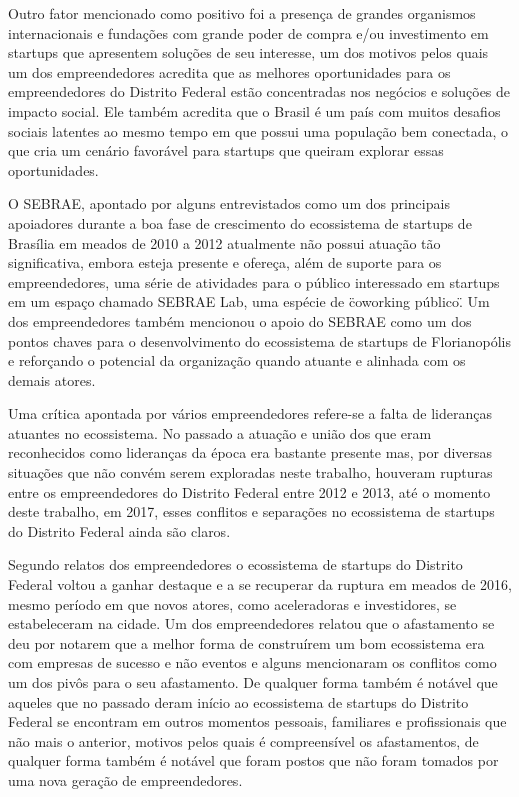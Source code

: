 Outro fator mencionado como positivo foi a presença de grandes organismos internacionais e fundações com grande poder de compra e/ou investimento em startups que apresentem soluções de seu interesse, um dos motivos pelos quais um dos empreendedores acredita que as melhores oportunidades para os empreendedores do Distrito Federal estão concentradas nos negócios e soluções de impacto social. Ele também acredita que o Brasil é um país com muitos desafios sociais latentes ao mesmo tempo em que possui uma população bem conectada, o que cria um cenário favorável para startups que queiram explorar essas oportunidades.

O SEBRAE, apontado por alguns entrevistados como um dos principais apoiadores durante a boa fase de crescimento do ecossistema de startups de Brasília em meados de 2010 a 2012 atualmente não possui atuação tão significativa, embora esteja presente e ofereça, além de suporte para os empreendedores, uma série de atividades para o público interessado em startups em um espaço chamado SEBRAE Lab, uma espécie de \"coworking público\". Um dos empreendedores também mencionou o apoio do SEBRAE como um dos pontos chaves para o desenvolvimento do ecossistema de startups de Florianopólis e reforçando o potencial da organização quando atuante e alinhada com os demais atores.

Uma crítica apontada por vários empreendedores refere-se a falta de lideranças atuantes no ecossistema. No passado a atuação e união dos que eram reconhecidos como lideranças da época era bastante presente mas, por diversas situações que não convém serem exploradas neste trabalho, houveram rupturas entre os empreendedores do Distrito Federal entre 2012 e 2013, até o momento deste trabalho, em 2017, esses conflitos e separações no ecossistema de startups do Distrito Federal ainda são claros. 

Segundo relatos dos empreendedores o ecossistema de startups do Distrito Federal voltou a ganhar destaque e a se recuperar da ruptura em meados de 2016, mesmo período em que novos atores, como aceleradoras e investidores, se estabeleceram na cidade. Um dos empreendedores relatou que o afastamento se deu por notarem que a melhor forma de construírem um bom ecossistema era com empresas de sucesso e não eventos e alguns mencionaram os conflitos como um dos pivôs para o seu afastamento. De qualquer forma também é notável que aqueles que no passado deram início ao ecossistema de startups do Distrito Federal se encontram em outros momentos pessoais, familiares e profissionais que não mais o anterior, motivos pelos quais é compreensível os afastamentos, de qualquer forma também é notável que foram postos que não foram tomados por uma nova geração de empreendedores.

